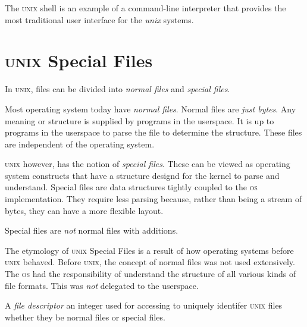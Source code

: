 The \textsc{unix} shell is an example of a command-line interpreter 
that provides the most traditional user interface for the \textit{unix} systems. 




\section{\textsc{unix} Special Files}


In \textsc{unix}, files can be divided into \textit{normal files} 
and \textit{special files}.


\begin{figure}[h]
\end{figure}

Most operating system today have \textit{normal files}.
Normal files are \textit{just bytes}. Any meaning or structure 
is supplied by programs in the userspace. 
It is up to programs in the userspace to parse the file 
to determine the structure.
These files are independent of the operating system.

\textsc{unix} however, has the notion of \textit{special files}.
These can be viewed as operating system constructs that 
have a structure designd for the kernel to parse and understand. 
Special files are data structures tightly coupled to 
the \textsc{os} implementation. They require less parsing 
because, rather than being a stream of bytes, they can have a more 
flexible layout. 

Special files are \textit{not} normal files with additions.

The etymology of \textsc{unix} Special Files is a result of how 
operating systems before \textsc{unix} behaved. Before \textsc{unix}, 
the concept of normal files was not used extensively. 
The \textsc{os} had the responsibility of understand the structure 
of all various kinds of file formats. This was \textit{not} delegated 
to the userspace. 

\frmrule

A \textit{file descriptor} an integer used for accessing to uniquely 
identifer \textsc{unix} files whether they be normal files or special files.

